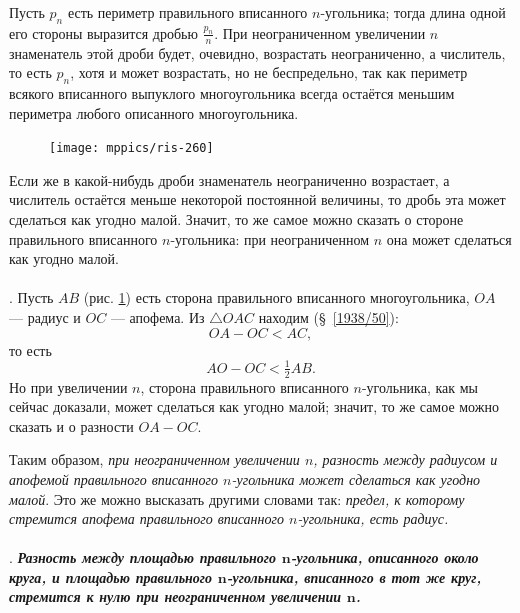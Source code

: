 \documentclass[twoside]{book}
\begin{document}
Пусть $p_n$ есть периметр правильного вписанного $n$-угольника;
тогда длина одной его стороны выразится дробью $\frac {p_n}n$.
При неограниченном увеличении $n$ знаменатель этой дроби будет, очевидно, возрастать неограниченно, а числитель, то есть $p_n$, хотя и может возрастать, но не беспредельно,
так как периметр всякого вписанного выпуклого многоугольника всегда остаётся меньшим периметра любого описанного многоугольника.

\begin{figure}
\vskip-4mm
\centering
\texttt{[image: mppics/ris-260]}
\caption{}\label{1938/ris-260}
\end{figure}

Если же в какой-нибудь дроби знаменатель неограниченно возрастает, а числитель остаётся меньше некоторой постоянной величины, то дробь эта может сделаться как угодно малой.
Значит, то же самое можно сказать о стороне правильного вписанного $n$-угольника:
при неограниченном $n$ она может сделаться как угодно малой.

\paragraph{}\label{1938/263}
\mbox{.}
Пусть $AB$ (рис. \ref{1938/ris-260}) есть сторона правильного вписанного многоугольника, $OA$ — радиус и $OC$ — апофема.
Из $\triangle OAC$ находим (§~\ref{1938/50}):
\[OA-OC<AC,\]
то есть
\[AO-OC<\tfrac12 AB.\]
Но при увеличении $n$, сторона правильного вписанного $n$-угольника, как мы сейчас доказали, может сделаться как угодно малой;
значит, то же самое можно сказать и о разности $OA-OC$.

{\sloppy

Таким образом, \emph{при неограниченном увеличении $n$, разность между радиусом и апофемой правильного вписанного $n$-угольника может сделаться как угодно малой}.
Это же можно высказать другими словами так: \emph{предел, к которому стремится апофема правильного вписанного $n$-угольника, есть радиус.}

}

\paragraph{}\label{1914/230}
.
\textbf{\emph{Разность между площадью правильного $\bm{n}$-угольника, описанного около круга, и площадью правильного $\bm{n}$-угольника, вписанного в тот же
круг, стремится к нулю при неограниченном увеличении $\bm{n}$.}}
\end{document}

